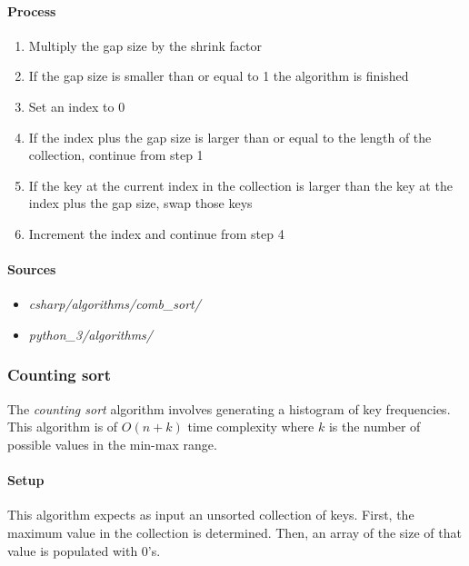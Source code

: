 \documentclass{article}
\begin{document}
\paragraph{Process}
\begin{enumerate}
\item{Multiply the gap size by the shrink factor}
\item{If the gap size is smaller than or equal to 1 the algorithm is finished}
\item{Set an index to 0}
\item{If the index plus the gap size is larger than or equal to the length of the collection, continue from step 1}
\item{If the key at the current index in the collection is larger than the key at the index plus the gap size,
  swap those keys}
\item{Increment the index and continue from step 4}
\end{enumerate}

\begin{samepage}
  \paragraph{Sources}
  \begin{itemize}
  \item{{\em csharp/algorithms/comb\_sort/}}
  \item{{\em python\_3/algorithms/}}
  \end{itemize}
\end{samepage}


\subsubsection{Counting sort}
The {\em counting sort} algorithm involves generating a histogram of key frequencies. This algorithm is of
\(O(n+k)\) time complexity where \(k\) is the number of possible values in the min-max range.

\paragraph{Setup}
This algorithm expects as input an unsorted collection of keys. First, the maximum value in the collection is
determined. Then, an array of the size of that value is populated with 0's.
\end{document}
